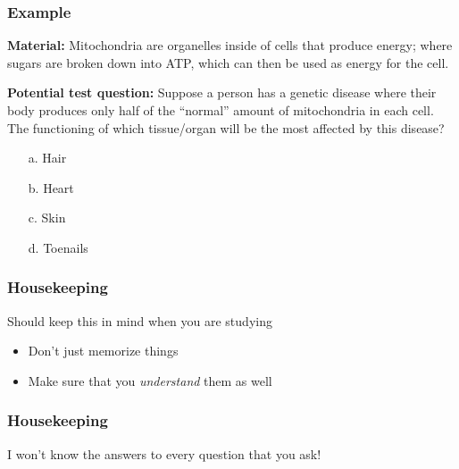 \documentclass[10pt]{beamer}
\begin{document}
\begin{frame}[t]
\frametitle{Example}
\vspace{0.5cm}

	\textbf{Material:} Mitochondria are organelles inside of cells that produce energy; where sugars are broken down into ATP, which can then be used as energy for the cell.
	
	\bigskip
	
	\textbf{Potential test question:}
	Suppose a person has a genetic disease where their body produces only half of the ``normal'' amount of mitochondria in each cell. The functioning of which tissue/organ will be the most affected by this disease? 
	
		\begin{enumerate}
			\item[a.] Hair
			\item[b.] Heart
			\item[c.] Skin
			\item[d.] Toenails 
		\end{enumerate}	
\end{frame}


\begin{frame}[t]
\frametitle{Housekeeping}
\vspace{0.5cm}

	Should keep this in mind when you are studying
	
		\begin{itemize}
			\medskip
			\item Don't just memorize things
			\bigskip
			\item Make sure that you \emph{understand} them as well
		\end{itemize}
\end{frame}


\begin{frame}[t]
\frametitle{Housekeeping}
\vspace{0.5cm}

	I won't know the answers to every question that you ask!

\end{frame}
\end{document}

